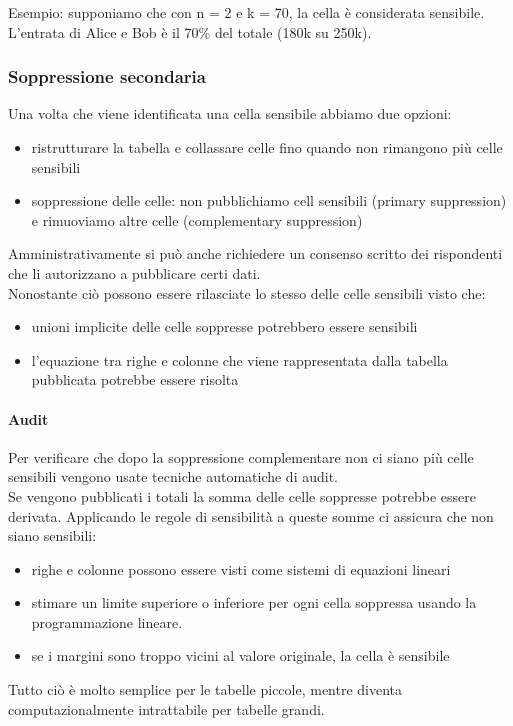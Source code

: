 Esempio: supponiamo che con n = 2 e k = 70, la cella è considerata sensibile.\\
L'entrata di Alice e Bob è il 70\% del totale (180k su 250k).

\subsubsection{Soppressione secondaria}
Una volta che viene identificata una cella sensibile abbiamo due opzioni:
\begin{itemize}
    \item ristrutturare la tabella e collassare celle fino quando non rimangono più celle sensibili
    \item soppressione delle celle: non pubblichiamo cell sensibili (primary suppression) e rimuoviamo altre celle (complementary suppression)
\end{itemize}
Amministrativamente si può anche richiedere un consenso scritto dei rispondenti che li autorizzano a pubblicare certi dati.\\
Nonostante ciò possono essere rilasciate lo stesso delle celle sensibili visto che:
\begin{itemize}
    \item unioni implicite delle celle soppresse potrebbero essere sensibili
    \item l'equazione tra righe e colonne che viene rappresentata dalla tabella pubblicata potrebbe essere risolta
\end{itemize}

\paragraph{Audit} Per verificare che dopo la soppressione complementare non ci siano più celle sensibili vengono usate tecniche automatiche di audit.\\
Se vengono pubblicati i totali la somma delle celle soppresse potrebbe essere derivata. Applicando le regole di sensibilità a queste somme ci assicura che non siano sensibili:
\begin{itemize}
    \item righe e colonne possono essere visti come sistemi di equazioni lineari
    \item stimare un limite superiore o inferiore per ogni cella soppressa usando la programmazione lineare.
    \item se i margini sono troppo vicini al valore originale, la cella è sensibile
\end{itemize}
Tutto ciò è molto semplice per le tabelle piccole, mentre diventa computazionalmente intrattabile per tabelle grandi.


